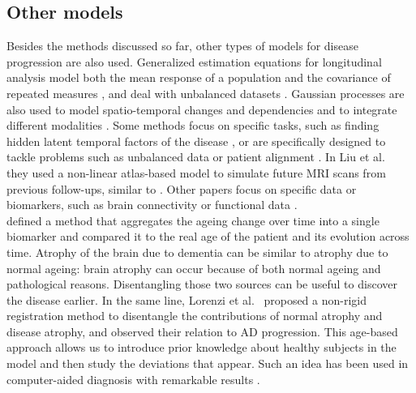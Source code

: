 \subsection{Other models}

Besides the methods discussed so far, other types of models for disease progression are also used.  Generalized estimation equations for longitudinal analysis \cite{liang1986longitudinal} model both the mean response of a population and the covariance of repeated measures \cite{Zhang2014}, and deal with unbalanced datasets \cite{Guillaume2014,Li2013}. Gaussian processes are also used to model spatio-temporal changes and dependencies \cite{Hyun2016,Lorenzi2015b,Lorenzi2015c} and to integrate different modalities \cite{Lorenzi2017}. Some methods focus on specific tasks, such as finding hidden latent temporal factors of the disease \cite{Chen2012,Wachinger2017}, or are specifically designed to tackle problems such as unbalanced data or patient alignment \cite{Bilgel2018,Dawson2016,Goyal2018,Li2013}. In Liu et al.\ \cite{Liu2015} they used a non-linear atlas-based model to simulate future MRI scans from previous follow-ups, similar to \cite{Lorenzi2015c}. Other papers focus on specific data or biomarkers, such as brain connectivity \cite{Chenhui2014} or functional data \cite{Li2017b}.  \\

\cite{Franke2010,Franke2012,Gaser2013} defined a method that aggregates the ageing change over time into a single biomarker and compared it to the real age of the patient and its evolution across time. Atrophy of the brain due to dementia can be similar to atrophy due to normal ageing: brain atrophy can occur because of both normal ageing and pathological reasons. Disentangling those two sources can be useful to discover the disease earlier. In the same line, Lorenzi et al.\ \cite{Lorenzi2014} proposed a non-rigid registration method to disentangle the contributions of normal atrophy and disease atrophy, and observed their relation to AD progression. This age-based approach allows us to introduce prior knowledge about healthy subjects in the model and then study the deviations that appear. Such an idea has been used in computer-aided diagnosis with remarkable results \cite{Gavidia-Bovadilla2017}. \\

